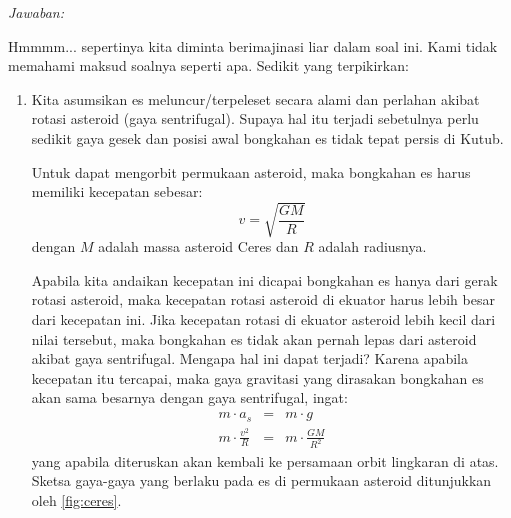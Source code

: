 \documentclass[11pt,fleqn]{exam}
\begin{document}
\begin{questions}
\textit{Jawaban: }

Hmmmm... sepertinya kita diminta berimajinasi liar dalam soal ini. Kami tidak memahami maksud soalnya seperti apa. Sedikit yang terpikirkan:

\begin{enumerate}[(1).]
\item Kita asumsikan es meluncur/terpeleset secara alami dan perlahan akibat rotasi asteroid (gaya sentrifugal). Supaya hal itu terjadi sebetulnya perlu sedikit gaya gesek dan posisi awal bongkahan es tidak tepat persis di Kutub.

Untuk dapat mengorbit permukaan asteroid, maka bongkahan es harus memiliki kecepatan sebesar:
$$v=\sqrt{\frac{GM}{R}}$$
dengan $M$ adalah massa asteroid Ceres dan $R$ adalah radiusnya. 

Apabila kita andaikan kecepatan ini dicapai bongkahan es hanya dari gerak rotasi asteroid, maka kecepatan rotasi asteroid di ekuator harus lebih besar dari kecepatan ini. Jika kecepatan rotasi di ekuator asteroid lebih kecil dari nilai tersebut, maka bongkahan es tidak akan pernah lepas dari asteroid akibat gaya sentrifugal. Mengapa hal ini dapat terjadi? Karena apabila kecepatan itu tercapai, maka gaya gravitasi yang dirasakan bongkahan es akan sama besarnya dengan gaya sentrifugal, ingat:
\begin{eqnarray*}
m \cdot a_s &=& m \cdot g\\
m \cdot \frac{v^2}{R} &=& m \cdot \frac{GM}{R^2}
\end{eqnarray*}
yang apabila diteruskan akan kembali ke persamaan orbit lingkaran di atas. Sketsa gaya-gaya yang berlaku pada es di permukaan asteroid ditunjukkan oleh \autoref{fig:ceres}.


\end{enumerate}
\end{questions}
\end{document}
